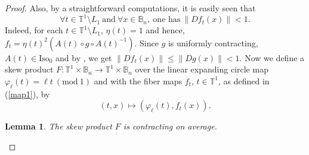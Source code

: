\documentclass[11pt,reqno]{amsart}
\theoremstyle{plain}
\newtheorem{lemma}[theorem]{Lemma}
\newtheorem*{theorem A}{Theorem A}
\newtheorem*{theorem B}{Theorem B}
\newtheorem*{theorem C}{Theorem C}
\newtheorem*{theorem 1}{Theorem 1}
\newtheorem*{theorem 2}{Theorem 2}
\newtheorem*{theorem 3}{Theorem 3}
\numberwithin{equation}{section}
\begin{document}
\begin{proof}
Also, by a straightforward computations, it is easily seen that
\begin{equation}\label{contract}
\forall t \in \mathbb{T}^1 \setminus L_1 \ \text{and} \ \forall x \in \mathbb{B}_n, \ \text{one \ has} \ \|Df_t(x)\| < 1.
\end{equation}
Indeed, for each $t \in \mathbb{T}^1 \setminus L_1$, $\eta(t)=1$ and hence, $f_t=\eta(t)^2( A(t) \circ g \circ A(t)^{-1})$.
Since $g$ is uniformly contracting, $A(t) \in \text{Iso}_0$ and by \cite[Theorem~5.3]{conrad2010isometries}, we get $\|Df_t(x)\| \leq \|Dg(x)\|< 1$.
Now we define a skew product $F \colon \mathbb{T}^1 \times \mathbb{B}_n \to \mathbb{T}^1 \times \mathbb{B}_n$ over the linear expanding circle map $\varphi_\ell(t)=\ell t \ (\text{mod} \ 1)$ and with the fiber maps $f_t$, $t \in \mathbb{T}^1$, as defined in (\ref{map1}), by
$$ (t,x)\mapsto (\varphi_\ell(t), f_t(x)). $$

\begin{lemma}\label{lemma0}
The skew product $F$ is contracting on average.
\end{lemma}


\end{proof}
\end{document}

